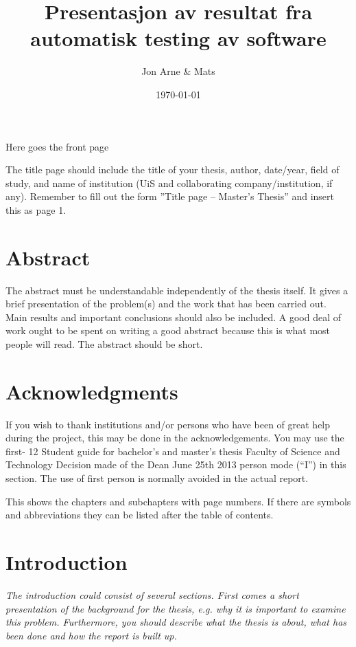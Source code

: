 \documentclass{article}
\author{Jon Arne \& Mats}
\title{Presentasjon av resultat fra automatisk testing av software}
\date{\today}
\begin{document}
	\begin{center}
		\begin{Huge}
			Here goes the front page
		\end{Huge} 
	\end{center}
	
	\pagebreak
	\maketitle
	The title page should include the title of your thesis, author, date/year, field of
	study, and name of institution (UiS and collaborating company/institution, if any). Remember
	to fill out the form ”Title page – Master’s Thesis” and insert this as page 1. 
	\pagebreak
	
	\section{Abstract}
	The abstract must be understandable independently of the thesis itself. It gives a
	brief presentation of the problem(s) and the work that has been carried out. Main results and
	important conclusions should also be included. A good deal of work ought to be spent on
	writing a good abstract because this is what most people will read. The abstract should be
	short. 
	\pagebreak
	
	
	
	\section{Acknowledgments}
	If you wish to thank institutions and/or persons who have been of great
	help during the project, this may be done in the acknowledgements. You may use the first-
	12
	Student guide for bachelor’s and master’s thesis
	Faculty of Science and Technology
	Decision made of the Dean June 25th 2013
	person mode (“I”) in this section. The use of first person is normally avoided in the actual
	report. 
	\pagebreak
	
	\tableofcontents 
	This shows the chapters and subchapters with page numbers. If there are
	symbols and abbreviations they can be listed after the table of contents. 
	\pagebreak
	
	\section{Introduction}
	\em The introduction could consist of several sections. First comes a short
	presentation of the background for the thesis, e.g. why it is important to examine this
	problem. Furthermore, you should describe what the thesis is about, what has been done and
	how the report is built up.\em
	
\end{document}
